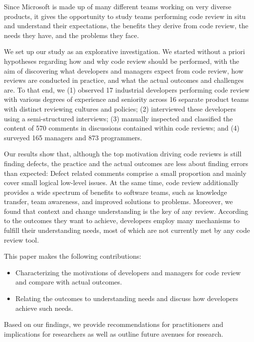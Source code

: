 Since Microsoft is made up of many different teams working on very diverse
products, it gives the opportunity to study teams performing code review in
situ and understand their expectations, the benefits they derive from code
review, the needs they have, and the problems they face.

We set up our study as an explorative investigation. We started without a
priori hypotheses regarding how and why code review should be performed, with
the aim of discovering what developers and managers expect from code review,
how reviews are conducted in practice, and what the actual outcomes and
challenges are. To that end, we (1) observed 17 industrial developers
performing code review with various degrees of experience and seniority across
16 separate product teams with distinct reviewing cultures and policies; (2)
interviewed these developers using a semi-structured interviews; (3) manually
inspected and classified the content of 570 comments in discussions contained
within code reviews; and (4) surveyed 165 managers and 873 programmers.

Our results show that, although the top motivation driving code reviews is
still finding defects, the practice and the actual outcomes are less about
finding errors than expected: Defect related comments comprise a small
proportion and mainly cover small logical low-level issues. At the same time,
code review additionally provides a wide spectrum of benefits to software
teams, such as knowledge transfer, team awareness, and improved solutions to
problems. Moreover, we found that context and change understanding is the key
of any review. According to the outcomes they want to achieve, developers
employ many mechanisms to fulfill their understanding needs, most of which are
not currently met by any code review tool.

This paper makes the following contributions:
\begin{itemize}
  \item Characterizing the motivations of developers and managers for code review and compare with actual outcomes.
  \item Relating the outcomes to understanding needs and discuss how developers achieve such needs.
\end{itemize}

Based on our findings, we provide recommendations for practitioners and
implications for researchers as well as outline future avenues for research.